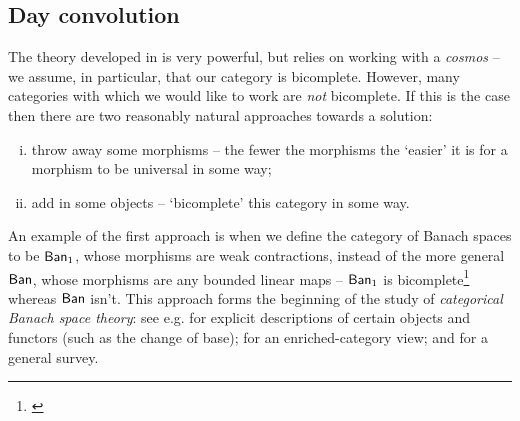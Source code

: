 
\subsection{Day convolution} %
\label{sub:day_convolution}

    The theory developed in \cite{Toen:2005wxa} is very powerful, but relies on working with a \emph{cosmos} -- we assume, in particular, that our category is bicomplete.
    However, many categories with which we would like to work are \emph{not} bicomplete.
    If this is the case then there are two reasonably natural approaches towards a solution:
    \begin{enumerate}[(i)]
        \item throw away some morphisms -- the fewer the morphisms the `easier' it is for a morphism to be universal in some way;
        \item add in some objects -- `bicomplete' this category in some way.
    \end{enumerate}

    An example of the first approach is when we define the category of Banach spaces to be $\mathsf{Ban}_1$, whose morphisms are weak contractions, instead of the more general $\mathsf{Ban}$, whose morphisms are any bounded linear maps -- $\mathsf{Ban}_1$ is bicomplete\footnote{
        \cite{Yuan:2012vt}
    } whereas $\mathsf{Ban}$ isn't.
    This approach forms the beginning of the study of \emph{categorical Banach space theory}: see e.g. \cite{Anonymous:-VM0nEAk} for explicit descriptions of certain objects and functors (such as the change of base); \cite{Cruttwell:2008wl} for an enriched-category view; and \cite{Castillo:2010vt} for a general survey.

    
